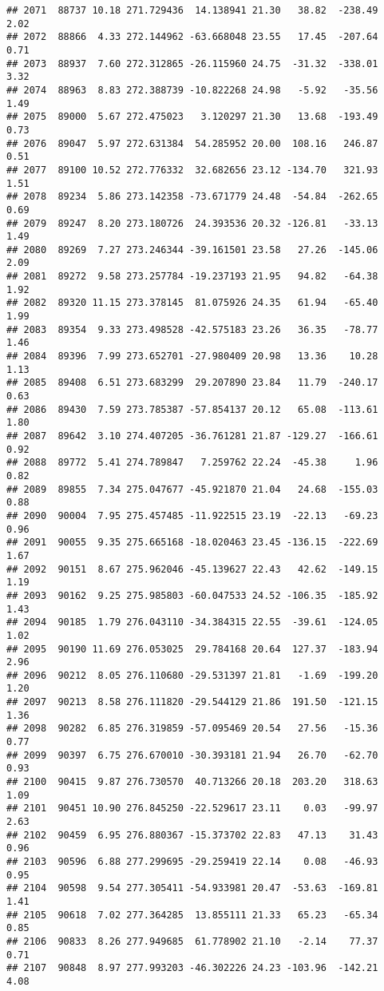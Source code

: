 \documentclass[]{article}
\begin{document}
\begin{verbatim}
## 2071  88737 10.18 271.729436  14.138941 21.30   38.82  -238.49  2.02
## 2072  88866  4.33 272.144962 -63.668048 23.55   17.45  -207.64  0.71
## 2073  88937  7.60 272.312865 -26.115960 24.75  -31.32  -338.01  3.32
## 2074  88963  8.83 272.388739 -10.822268 24.98   -5.92   -35.56  1.49
## 2075  89000  5.67 272.475023   3.120297 21.30   13.68  -193.49  0.73
## 2076  89047  5.97 272.631384  54.285952 20.00  108.16   246.87  0.51
## 2077  89100 10.52 272.776332  32.682656 23.12 -134.70   321.93  1.51
## 2078  89234  5.86 273.142358 -73.671779 24.48  -54.84  -262.65  0.69
## 2079  89247  8.20 273.180726  24.393536 20.32 -126.81   -33.13  1.49
## 2080  89269  7.27 273.246344 -39.161501 23.58   27.26  -145.06  2.09
## 2081  89272  9.58 273.257784 -19.237193 21.95   94.82   -64.38  1.92
## 2082  89320 11.15 273.378145  81.075926 24.35   61.94   -65.40  1.99
## 2083  89354  9.33 273.498528 -42.575183 23.26   36.35   -78.77  1.46
## 2084  89396  7.99 273.652701 -27.980409 20.98   13.36    10.28  1.13
## 2085  89408  6.51 273.683299  29.207890 23.84   11.79  -240.17  0.63
## 2086  89430  7.59 273.785387 -57.854137 20.12   65.08  -113.61  1.80
## 2087  89642  3.10 274.407205 -36.761281 21.87 -129.27  -166.61  0.92
## 2088  89772  5.41 274.789847   7.259762 22.24  -45.38     1.96  0.82
## 2089  89855  7.34 275.047677 -45.921870 21.04   24.68  -155.03  0.88
## 2090  90004  7.95 275.457485 -11.922515 23.19  -22.13   -69.23  0.96
## 2091  90055  9.35 275.665168 -18.020463 23.45 -136.15  -222.69  1.67
## 2092  90151  8.67 275.962046 -45.139627 22.43   42.62  -149.15  1.19
## 2093  90162  9.25 275.985803 -60.047533 24.52 -106.35  -185.92  1.43
## 2094  90185  1.79 276.043110 -34.384315 22.55  -39.61  -124.05  1.02
## 2095  90190 11.69 276.053025  29.784168 20.64  127.37  -183.94  2.96
## 2096  90212  8.05 276.110680 -29.531397 21.81   -1.69  -199.20  1.20
## 2097  90213  8.58 276.111820 -29.544129 21.86  191.50  -121.15  1.36
## 2098  90282  6.85 276.319859 -57.095469 20.54   27.56   -15.36  0.77
## 2099  90397  6.75 276.670010 -30.393181 21.94   26.70   -62.70  0.93
## 2100  90415  9.87 276.730570  40.713266 20.18  203.20   318.63  1.09
## 2101  90451 10.90 276.845250 -22.529617 23.11    0.03   -99.97  2.63
## 2102  90459  6.95 276.880367 -15.373702 22.83   47.13    31.43  0.96
## 2103  90596  6.88 277.299695 -29.259419 22.14    0.08   -46.93  0.95
## 2104  90598  9.54 277.305411 -54.933981 20.47  -53.63  -169.81  1.41
## 2105  90618  7.02 277.364285  13.855111 21.33   65.23   -65.34  0.85
## 2106  90833  8.26 277.949685  61.778902 21.10   -2.14    77.37  0.71
## 2107  90848  8.97 277.993203 -46.302226 24.23 -103.96  -142.21  4.08

\end{verbatim}
\end{document}
